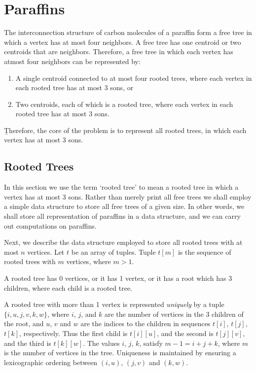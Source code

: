  



\section{Paraffins}
The interconnection structure of carbon molecules of a paraffin 
form a free tree in which a vertex has
at most four neighbors.
A free tree has one centroid or two centroids that are neighbors.
Therefore, a free tree in which each vertex has atmost four neighbors
can be represented by:
\begin{enumerate}
   \item A single centroid connected to at most four rooted trees, 
   where each vertex in each rooted tree has at most 3 sons, or
   \item Two centroids, each of which is a rooted tree,
   where each vertex in each rooted tree has at most 3 sons.
\end{enumerate} 
\b Therefore, the core of the problem is to represent all rooted trees,
in which each vertex has at most 3 sons. \rm


\subsection{Rooted Trees}
In this section we use the term `rooted tree' to mean a rooted tree in
which a vertex has at most 3 sons.
Rather than merely print all free trees we shall employ a simple data
structure to store all free trees of a given size.
In other words, we shall store all representation of paraffins
in a data structure, and we can carry out computations on paraffins.

Next, we describe the data structure employed to store all rooted trees
with at most $n$ vertices.
Let $t$ be an array of tuples.
Tuple $t[m]$ is the sequence of rooted trees with $m$ vertices, where $m > 1$. 

A rooted tree has 0 vertices, or it has 1 vertex, or it has
a root which has 3 children, where each child is a rooted tree.

A rooted tree with more than 1 vertex is represented {\em uniquely} by a 
tuple $\{i,u,j,v,k,w\}$,
where $i$, $j$, and $k$ are the number of vertices in the 3 children
of the root, and $u$, $v$ and $w$ are the indices
to the children in sequences $t[i]$, $t[j]$, $t[k]$, respectively.
Thus the first child is $t[i][u]$, and the second is $t[j][v]$,
and the third is $t[k][w]$.
The values $i$, $j$, $k$, satisfy $m-1 = i+j+k$, where $m$ is the
number of vertices in the tree.
Uniqueness is maintained by ensuring a lexicographic ordering between
$(i,u)$, $(j,v)$ and $(k,w)$.

